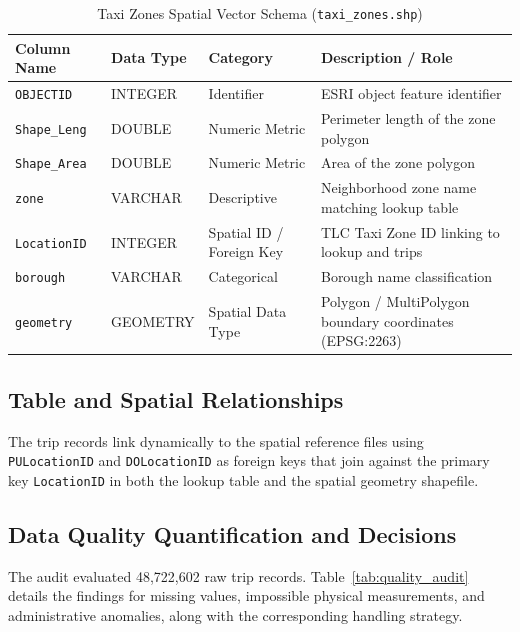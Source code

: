 \documentclass[11pt,a4paper]{article}
\begin{document}
\begin{table}[htbp]
\centering
\caption{Taxi Zones Spatial Vector Schema (\texttt{taxi\_zones.shp})}
\label{tab:spatial_schema}
\small
\begin{tabularx}{\textwidth}{llXX}
\toprule
\textbf{Column Name} & \textbf{Data Type} & \textbf{Category} & \textbf{Description / Role} \\
\midrule
\texttt{OBJECTID} & INTEGER & Identifier & ESRI object feature identifier \\
\texttt{Shape\_Leng} & DOUBLE & Numeric Metric & Perimeter length of the zone polygon \\
\texttt{Shape\_Area} & DOUBLE & Numeric Metric & Area of the zone polygon \\
\texttt{zone} & VARCHAR & Descriptive & Neighborhood zone name matching lookup table \\
\texttt{LocationID} & INTEGER & Spatial ID / Foreign Key & TLC Taxi Zone ID linking to lookup and trips \\
\texttt{borough} & VARCHAR & Categorical & Borough name classification \\
\texttt{geometry} & GEOMETRY & Spatial Data Type & Polygon / MultiPolygon boundary coordinates (EPSG:2263) \\
\bottomrule
\end{tabularx}
\end{table}

\subsection{Table and Spatial Relationships}
The trip records link dynamically to the spatial reference files using \texttt{PULocationID} and \texttt{DOLocationID} as foreign keys that join against the primary key \texttt{LocationID} in both the lookup table and the spatial geometry shapefile.

\subsection{Data Quality Quantification and Decisions}
The audit evaluated 48,722,602 raw trip records. Table~\ref{tab:quality_audit} details the findings for missing values, impossible physical measurements, and administrative anomalies, along with the corresponding handling strategy.
\end{document}
